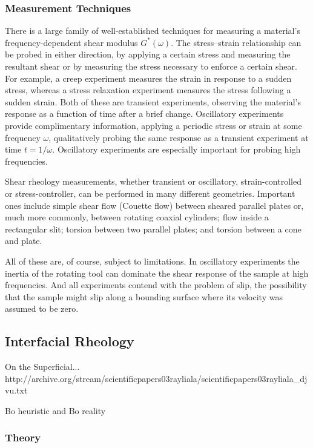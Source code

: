 \subsubsection{Measurement Techniques}

There is a large family of well-established techniques for measuring a material's frequency-dependent shear modulus $G^*(\omega)$. The stress--strain relationship can be probed in either direction, by applying a certain stress and measuring the resultant shear or by measuring the stress necessary to enforce a certain shear. For example, a creep experiment measures the strain in response to a sudden stress, whereas a stress relaxation experiment measures the stress following a sudden strain. Both of these are transient experiments, observing the material's response as a function of time after a brief change. Oscillatory experiments provide complimentary information, applying a periodic stress or strain at some frequency $\omega$, qualitatively probing the same response as a transient experiment at time $t=1/\omega$. Oscillatory experiments are especially important for probing high frequencies.

Shear rheology measurements, whether transient or oscillatory, strain-controlled or stress-controller, can be performed in many different geometries. Important ones include simple shear flow (Couette flow) between sheared parallel plates or, much more commonly, between rotating coaxial cylinders; flow inside a rectangular slit; torsion between two parallel plates; and torsion between a cone and plate.

All of these are, of course, subject to limitations. In oscillatory experiments the inertia of the rotating tool can dominate the shear response of the sample at  high frequencies. And all experiments contend with the problem of slip, the possibility that the sample might slip along a bounding surface where its velocity was assumed to be zero.

\subsection{Interfacial Rheology}



On the Superficial... http://archive.org/stream/scientificpapers03rayliala/scientificpapers03rayliala_djvu.txt

Bo heuristic and Bo reality
\subsubsection{Theory}

